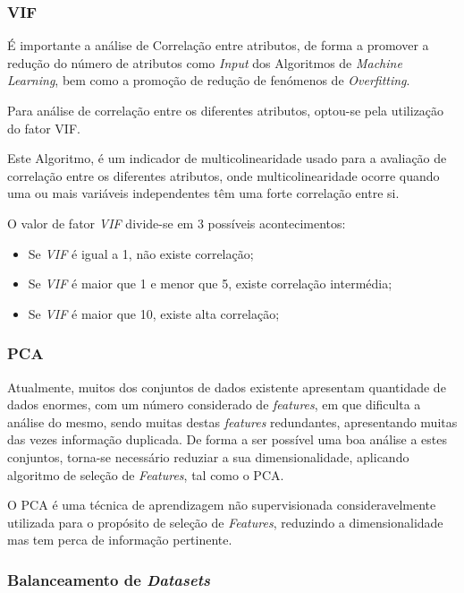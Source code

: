 \documentclass[12pt,a4paper,twoside]{report}
\begin{document}
{\subsubsection{VIF}

É importante a análise de Correlação entre atributos, de forma a promover a redução do número de atributos como \emph{Input} dos Algoritmos de  \emph{Machine Learning}, bem como a promoção de redução de fenómenos de \emph{Overfitting}. 

Para análise de correlação entre os diferentes atributos, optou-se pela utilização do fator \gls{VIF}.

Este Algoritmo, é um indicador de multicolinearidade usado para a avaliação de correlação entre os diferentes atributos, onde multicolinearidade ocorre quando uma ou mais variáveis independentes têm uma forte correlação entre si. 

O valor de fator \emph{VIF} divide-se em 3 possíveis acontecimentos:
\begin{itemize} 
\itemsep-0.5em 
    \item Se \emph{VIF} é igual a 1, não existe correlação;
    \item Se  \emph{VIF} é maior que 1 e menor que 5, existe correlação intermédia; 
    \item Se \emph{VIF} é maior que 10, existe alta correlação;
\end{itemize}

\subsubsection{\gls{PCA}}

Atualmente, muitos dos conjuntos de dados existente apresentam quantidade de dados enormes, com um número considerado de \textit{features}, em que dificulta a análise do mesmo, sendo muitas destas \textit{features} redundantes, apresentando muitas das vezes informação duplicada. De forma a ser possível uma boa análise a estes conjuntos, torna-se necessário reduziar a sua dimensionalidade, aplicando algoritmo de seleção de \textit{Features}, tal como o \gls{PCA}.

O \gls{PCA} é uma técnica de aprendizagem não supervisionada consideravelmente utilizada para o propósito de seleção de \textit{Features}, reduzindo a dimensionalidade mas tem perca de informação pertinente.


\subsubsection{Balanceamento de \textit{Datasets}}

}
\end{document}
